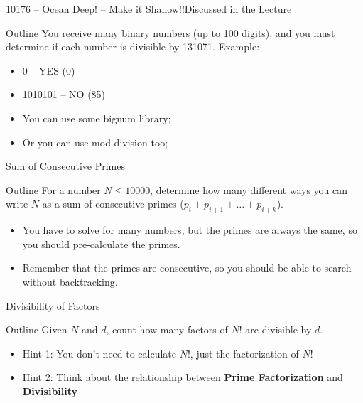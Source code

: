 \begin{frame}{10176 -- Ocean Deep! -- Make it Shallow!!}{Discussed in the Lecture}

  \begin{block}{Outline}
    You receive many binary numbers (up to 100 digits), and you must determine if each number is divisible by 131071. Example:
    \bigskip

    \begin{itemize}
      \item 0 -- YES (0)
      \item 1010101 -- NO (85)
    \end{itemize}
  \end{block}\bigskip

  \begin{itemize}
    \item You can use some bignum library;
    \item Or you can use mod division too;
  \end{itemize}
\end{frame}

\begin{frame}{Sum of Consecutive Primes}
  \begin{block}{Outline}
    For a number $N \leq 10000$, determine how many different ways you can write $N$ as a sum of consecutive primes ($p_i + p_{i+1} + \ldots + p_{i+k}$).
  \end{block}\bigskip

  \begin{itemize}
    \item You have to solve for many numbers, but the primes are always the same, so you should pre-calculate the primes.
    \item Remember that the primes are consecutive, so you should be able to search without backtracking.
  \end{itemize}
\end{frame}

\begin{frame}{Divisibility of Factors}
  \begin{block}{Outline}
    Given $N$ and $d$, count how many factors of $N!$ are divisible by $d$.
  \end{block}\bigskip

  \begin{itemize}
    \item Hint 1: You don't need to calculate $N!$, just the factorization of $N!$
    \item Hint 2: Think about the relationship between {\bf Prime Factorization} and {\bf Divisibility}
  \end{itemize}
\end{frame}

